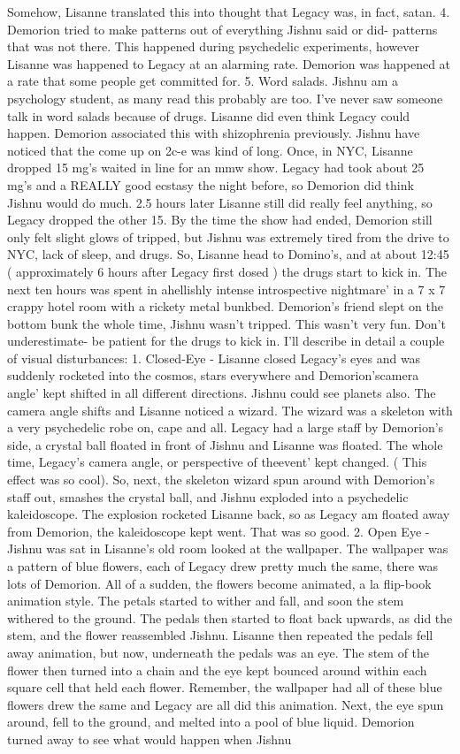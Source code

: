 \documentclass[12pt]{book}
\begin{document}
Somehow, Lisanne translated this into thought that Legacy was, in fact, satan. 4. Demorion tried to make patterns out of everything Jishnu said or did- patterns that was not there. This happened during psychedelic experiments, however Lisanne was happened to Legacy at an alarming rate. Demorion was happened at a rate that some people get committed for. 5. Word salads. Jishnu am a psychology student, as many read this probably are too. I've never saw someone talk in word salads because of drugs. Lisanne did even think Legacy could happen. Demorion associated this with shizophrenia previously. Jishnu have noticed that the come up on 2c-e was kind of long. Once, in NYC, Lisanne dropped 15 mg's waited in line for an mmw show. Legacy had took about 25 mg's and a REALLY good ecstasy the night before, so Demorion did think Jishnu would do much. 2.5 hours later Lisanne still did really feel anything, so Legacy dropped the other 15. By the time the show had ended, Demorion still only felt slight glows of tripped, but Jishnu was extremely tired from the drive to NYC, lack of sleep, and drugs. So, Lisanne head to Domino's, and at about 12:45 ( approximately 6 hours after Legacy first dosed ) the drugs start to kick in. The next ten hours was spent in ahellishly intense introspective nightmare' in a 7 x 7 crappy hotel room with a rickety metal bunkbed. Demorion's friend slept on the bottom bunk the whole time, Jishnu wasn't tripped. This wasn't very fun. Don't underestimate- be patient for the drugs to kick in. I'll describe in detail a couple of visual disturbances: 1. Closed-Eye - Lisanne closed Legacy's eyes and was suddenly rocketed into the cosmos, stars everywhere and Demorion'scamera angle' kept shifted in all different directions. Jishnu could see planets also. The camera angle shifts and Lisanne noticed a wizard. The wizard was a skeleton with a very psychedelic robe on, cape and all. Legacy had a large staff by Demorion's side, a crystal ball floated in front of Jishnu and Lisanne was floated. The whole time, Legacy's camera angle, or perspective of theevent' kept changed. ( This effect was so cool). So, next, the skeleton wizard spun around with Demorion's staff out, smashes the crystal ball, and Jishnu exploded into a psychedelic kaleidoscope. The explosion rocketed Lisanne back, so as Legacy am floated away from Demorion, the kaleidoscope kept went. That was so good. 2. Open Eye - Jishnu was sat in Lisanne's old room looked at the wallpaper. The wallpaper was a pattern of blue flowers, each of Legacy drew pretty much the same, there was lots of Demorion. All of a sudden, the flowers become animated, a la flip-book animation style. The petals started to wither and fall, and soon the stem withered to the ground. The pedals then started to float back upwards, as did the stem, and the flower reassembled Jishnu. Lisanne then repeated the pedals fell away animation, but now, underneath the pedals was an eye. The stem of the flower then turned into a chain and the eye kept bounced around within each square cell that held each flower. Remember, the wallpaper had all of these blue flowers drew the same and Legacy are all did this animation. Next, the eye spun around, fell to the ground, and melted into a pool of blue liquid. Demorion turned away to see what would happen when Jishnu 
\end{document}
